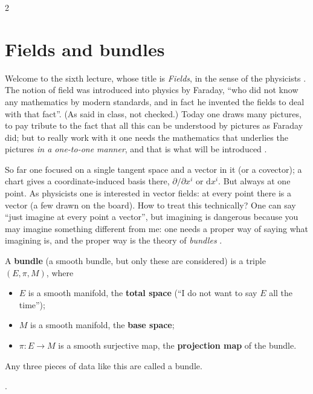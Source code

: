 \begin{paracol}{2}
\section{Fields and bundles}\label{sec:c06-bundles}

Welcome to the sixth lecture, whose title is \emph{Fields}, in the sense of the physicists . The notion of field was introduced into physics by Faraday, ``who did not know any mathematics by modern standards, and in fact he invented the fields to deal with that fact''. (As said in class, not checked.)
Today one draws many pictures, to pay tribute to the fact that all this can be understood by pictures as Faraday did; but to really work with it one needs the mathematics that underlies the pictures \emph{in a one-to-one manner}, and that is what will be introduced .

So far one focused on a single tangent space and a vector in it (or a covector); a chart gives a coordinate-induced basis there, $\partial/\partial x^i$ or $\mathrm dx^i$. But always at one point. As physicists one is interested in vector fields: at every point there is a vector (a few drawn on the board).
How to treat this technically? One can say ``just imagine at every point a vector'', but imagining is dangerous because you may imagine something different from me: one needs a proper way of saying what imagining is, and the proper way is the theory of \emph{bundles} .

\begin{definition}\label{def:c06-bundle}
A \textbf{bundle} (a smooth bundle, but only these are considered) is a triple $(E,\pi,M)$, where
\begin{itemize}
  \item $E$ is a smooth manifold, the \textbf{total space} (``I do not want to say $E$ all the time'');
  \item $M$ is a smooth manifold, the \textbf{base space};
  \item $\pi\colon E\to M$ is a smooth surjective map, the \textbf{projection map} of the bundle.
\end{itemize}
Any three pieces of data like this are called a bundle.
\end{definition}
.


\end{paracol}
